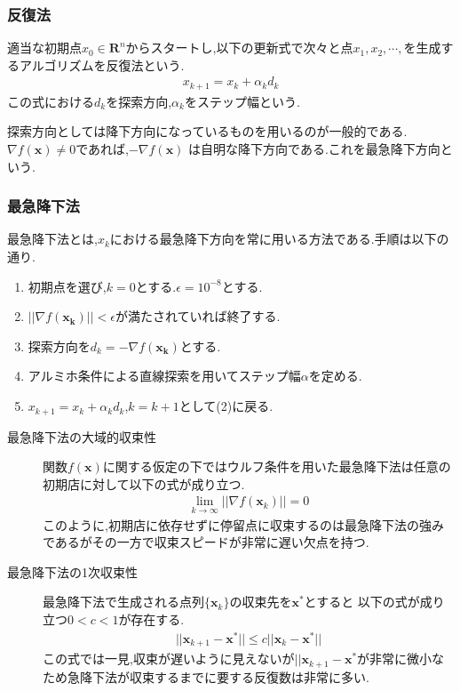 \documentclass[12pt]{jarticle}
\begin{document}
\subsubsection{反復法}
適当な初期点$x_0\in \boldsymbol{R}^n$からスタートし,以下の更新式で次々と点$x_1,x_2,\cdots,$を生成するアルゴリズムを反復法という.
\begin{eqnarray}
    x_{k+1}=x_k+\alpha_kd_k\nonumber
\end{eqnarray}
この式における$d_k$を探索方向,$\alpha_k$をステップ幅という.\\
\par 探索方向としては降下方向になっているものを用いるのが一般的である.$\nabla f(\boldsymbol{x})\neq 0$であれば,$-\nabla f(\boldsymbol{x})$
は自明な降下方向である.これを最急降下方向という.
\subsubsection{最急降下法}
最急降下法とは,$x_k$における最急降下方向を常に用いる方法である.手順は以下の通り.
\begin{enumerate}
    \item 初期点を選び,$k=0$とする.$\epsilon=10^{-8}$とする.
    \item $||\nabla f(\boldsymbol{x_k})||<\epsilon$が満たされていれば終了する.
    \item 探索方向を$d_k=-\nabla f(\boldsymbol{x_k})$とする.
    \item アルミホ条件による直線探索を用いてステップ幅$\alpha$を定める.
    \item $x_{k+1}=x_k+\alpha_kd_k$,$k=k+1$として(2)に戻る.
\end{enumerate}
\begin{description}
    \item[最急降下法の大域的収束性] 関数$f(\boldsymbol{x})$に関する仮定の下ではウルフ条件を用いた最急降下法は任意の初期店に対して以下の式が成り立つ. 
    \begin{eqnarray}
        \lim_{k\rightarrow \infty}||\nabla f(\boldsymbol{x}_k)||=0\nonumber
    \end{eqnarray}
    このように,初期店に依存せずに停留点に収束するのは最急降下法の強みであるがその一方で収束スピードが非常に遅い欠点を持つ. 
    \item[最急降下法の1次収束性] 最急降下法で生成される点列$\{\boldsymbol{x}_k\}$の収束先を$\boldsymbol{x}^*$とすると
    以下の式が成り立つ$0<c<1$が存在する.
    \begin{eqnarray}
        ||\boldsymbol{x}_{k+1}-\boldsymbol{x}^*||\leq c||\boldsymbol{x}_{k}-\boldsymbol{x}^*||\nonumber
    \end{eqnarray}
    この式では一見,収束が遅いように見えないが$||\boldsymbol{x}_{k+1}-\boldsymbol{x}^*$が非常に微小なため急降下法が収束するまでに要する反復数は非常に多い.
\end{description}
\end{document}
